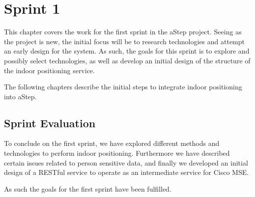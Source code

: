 \chapter{Sprint 1}
This chapter covers the work for the first sprint in the aStep project. Seeing as the project is new, the initial focus will be to research technologies and attempt an early design for the system. As such, the goals for this sprint is to explore and possibly select technologies, as well as develop an initial design of the structure of the indoor positioning service. 

The following chapters describe the initial steps to integrate indoor positioning into aStep.





\section{Sprint Evaluation}
To conclude on the first sprint, we have explored different methods and technologies to perform indoor positioning. Furthermore we have described certain issues related to person sensitive data, and finally we developed an initial design of a RESTful service to operate as an intermediate service for Cisco MSE. 

As such the goals for the first sprint have been fulfilled.